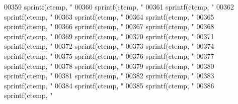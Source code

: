 \begin{DoxyCode}
{{{{{{{{{{{{{{{{{{{{{{{{{{{{{{{{{{{{{{{{{{{{{{{{{{{{{{{{{{{{{{{{{{{{{{{{{{{{{{{{{{{{{{{{{{{{{{{{{{{{{{{{{{{{{{{{{{{{{{{{{{{{{{{{{{{{{{{{{{{{{{{{{{{{{{{{{{{{{{{{{{{{{{{{{{{{{{{{{{{{{{{{{{{{{{{{{{{{{{{{{{{{{{{{{{{{{{{{{{{00359     sprintf(ctemp, \textcolor{stringliteral}{"%
00360     sprintf(ctemp, \textcolor{stringliteral}{"%
00361     sprintf(ctemp, \textcolor{stringliteral}{"%
00362     sprintf(ctemp, \textcolor{stringliteral}{"%
00363     sprintf(ctemp, \textcolor{stringliteral}{"%
00364     sprintf(ctemp, \textcolor{stringliteral}{"%
00365     sprintf(ctemp, \textcolor{stringliteral}{"%
00366     sprintf(ctemp, \textcolor{stringliteral}{"%
00367     sprintf(ctemp, \textcolor{stringliteral}{"%
00368     sprintf(ctemp, \textcolor{stringliteral}{"%
00369     sprintf(ctemp, \textcolor{stringliteral}{"%
00370     sprintf(ctemp, \textcolor{stringliteral}{"%
00371     sprintf(ctemp, \textcolor{stringliteral}{"%
00372     sprintf(ctemp, \textcolor{stringliteral}{"%
00373     sprintf(ctemp, \textcolor{stringliteral}{"%
00374     sprintf(ctemp, \textcolor{stringliteral}{"%
00375     sprintf(ctemp, \textcolor{stringliteral}{"%
00376     sprintf(ctemp, \textcolor{stringliteral}{"%
00377     sprintf(ctemp, \textcolor{stringliteral}{"%
00378     sprintf(ctemp, \textcolor{stringliteral}{"%
00379     sprintf(ctemp, \textcolor{stringliteral}{"%
00380     sprintf(ctemp, \textcolor{stringliteral}{"%
00381     sprintf(ctemp, \textcolor{stringliteral}{"%
00382     sprintf(ctemp, \textcolor{stringliteral}{"%
00383     sprintf(ctemp, \textcolor{stringliteral}{"%
00384     sprintf(ctemp, \textcolor{stringliteral}{"%
00385     sprintf(ctemp, \textcolor{stringliteral}{"%
00386     sprintf(ctemp, \textcolor{stringliteral}{"%
}}}}}}}}}}}}}}}}}}}}}}}}}}}}}}}}}}}}}}}}}}}}}}}}}}}}}}}}}}}}}}}}}}}}}}}}}}}}}}}}}}}}}}}}}}}}}}}}}}}}}}}}}}}}}}}}}}}}}}}}}}}}}}}}}}}}}}}}}}}}}}}}}}}}}}}}}}}}}}}}}}}}}}}}}}}}}}}}}}}}}}}}}}}}}}}}}}}}}}}}}}}}}}}}}}}}}}}}}}}}}}}}}}}}}}}}}}}}}}}}}}}}}}}
\end{DoxyCode}
